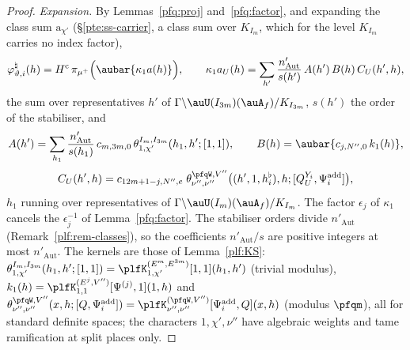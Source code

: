 \documentclass[10pt]{amsart}
\theoremstyle{definition}
\theoremstyle{remark}
\begin{document}
\begin{proof}
\emph{Expansion.} By Lemmas~\ref{pfq:proj} and~\ref{pfq:factor}, and expanding the class sum $\mathrm a_{\chi'}$ (\S\ref{pte:ss-carrier},
a class sum over $K_{I_m}$, which for the level $K_{I_m}$ carries no index factor),
\begin{equation}\label{pfq:eq-expand}
\varphi^\natural_{\vartheta,i}(h)=H^{\mathrm c}\,\pi_{\mu^+}\Bigl(\aubar{\kappa_1a(h)}\Bigr),\qquad
\kappa_1a_U(h)=\sum_{h'}\frac{n'_{\mathrm{Aut}}}{s(h')}\,A(h')\,B(h)\,C_U(h',h),
\end{equation}
the sum over representatives $h'$ of $\Gamma\backslash\auU(I_{3m})(\auA_f)/K_{I_{3m}}$, $s(h')$ the order of the stabiliser, and
\[
A(h')=\sum_{h_1}\frac{n'_{\mathrm{Aut}}}{s(h_1)}\,c_{m,3m,0}\,\theta^{I_m,I_{3m}}_{1,\chi'}(h_1,h';[1,1]),\qquad
B(h)=\aubar{c_{j,N'',0}\,k_1(h)},
\]
\[
C_U(h',h)=c_{12m+1-j,N'',e}\;\theta^{\pfqW,V''}_{\nu'',\nu''}\bigl((h',1,h^\flat_i),h;[Q^{Y_i}_U,\Psi^{\mathrm{add}}_i]\bigr),
\]
$h_1$ running over representatives of $\Gamma\backslash\auU(I_m)(\auA_f)/K_{I_m}$. The factor $\epsilon_j$ of $\kappa_1$ cancels the
$\epsilon_j^{-1}$ of Lemma~\ref{pfq:factor}. The stabiliser orders divide $n'_{\mathrm{Aut}}$ (Remark~\ref{plf:rem-classes}), so the
coefficients $n'_{\mathrm{Aut}}/s$ are positive integers at most $n'_{\mathrm{Aut}}$. The kernels are those of Lemma~\ref{plf:KS}:
$\theta^{I_m,I_{3m}}_{1,\chi'}(h_1,h';[1,1])=\plfK^{(E^m,E^{3m})}_{1,\chi'}[1,1](h_1,h')$ (trivial modulus), $k_1(h)=\plfK^{(E^j,V'')}_{1,1}
[\Psi^{(j)},1](1,h)$ and $\theta^{\pfqW,V''}_{\nu'',\nu''}(x,h;[Q,\Psi^{\mathrm{add}}_i])=\plfK^{(\pfqW,V'')}_{\nu'',\nu''}[\Psi^{\mathrm{add}}_i,Q](x,h)$
(modulus $\pfqm$), all for standard definite spaces; the characters $1,\chi',\nu''$ have algebraic weights and tame
ramification at split places only.


\end{proof}
\end{document}
